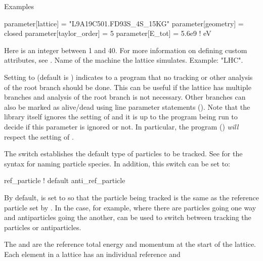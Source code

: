 \noindent
Examples
\begin{example}
  parameter[lattice]      = "L9A19C501.FD93S_4S_15KG"
  parameter[geometry]     = closed
  parameter[taylor_order] = 5
  parameter[E_tot]        = 5.6e9    ! eV
\end{example}

  \begin{description}
%
  \item[{parameter[custom_attributeN]}] \Newline
Here  is an integer between 1 and 40.  For more information on defining custom attributes, see
.
%
Name of the machine the lattice simulates. Example: "LHC".
%
  \item[{parameter[live_branch]}] \Newline
Setting  to  (default is ) indicates to a program that no
tracking or other analysis of the root branch should be done. This can be useful if the lattice has
multiple branches and analysis of the root branch is not necessary. Other branches can also be
marked as alive/dead using line parameter statements (). Note that the \bmad
library itself ignores the setting of  and it is up to the program being run to
decide if this parameter is ignored or not. In particular, the \tao program ()
{\em will} respect the setting of .
%
  \item[{parameter[default_tracking_species]}] \Newline
The  switch establishes the default type of particles to be
tracked. See  for the syntax for naming particle species. In addition, this switch
can be set to:
\begin{example}
  ref_particle     ! default
  anti_ref_particle
\end{example}
By default,  is set to  so that the particle being
tracked is the same as the reference particle set by . In the case, for example,
where there are particles going one way and antiparticles going the another,
 can be used to switch between tracking the particles or antiparticles.
%
  \item[{parameter[e_tot], parameter[p0c]}] \Newline
The  and  are the reference total energy and momentum at the
start of the lattice. Each element in a lattice has an individual reference  and 

\end{description}
